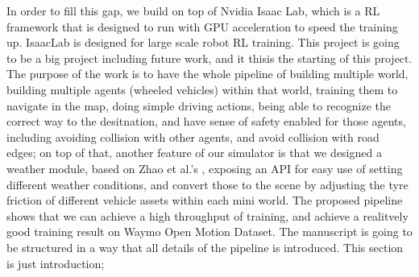 In order to fill this gap, we build on top of Nvidia Isaac Lab\cite{nvidia_isaac_2025}, which is a RL framework that is designed to run with GPU acceleration to speed the training up. IsaacLab is designed for large scale robot RL training. This project is going to be a big project including future work, and it thisis the starting of this project. The purpose of the work is to have the whole pipeline of building multiple world, building multiple agents (wheeled vehicles) within that world, training them to navigate in the map, doing simple driving actions, being able to recognize the correct way to the desitnation, and have sense of safety enabled for those agents, including avoiding collision with other agents, and avoid collision with road edges; on top of that, another feature of our simulator is that we designed a weather module, based on Zhao et al.'s \cite{zhao_tire-pavement_2024}, exposing an API for easy use of setting different weather conditions, and convert those to the scene by adjusting the tyre friction of different vehicle assets within each mini world. The proposed pipeline shows that we can achieve a high throughput of training, and achieve a realitvely good training result on Waymo Open Motion Dataset. The manuscript is going to be structured in a way that all details of the pipeline is introduced. This section is just introduction; 
